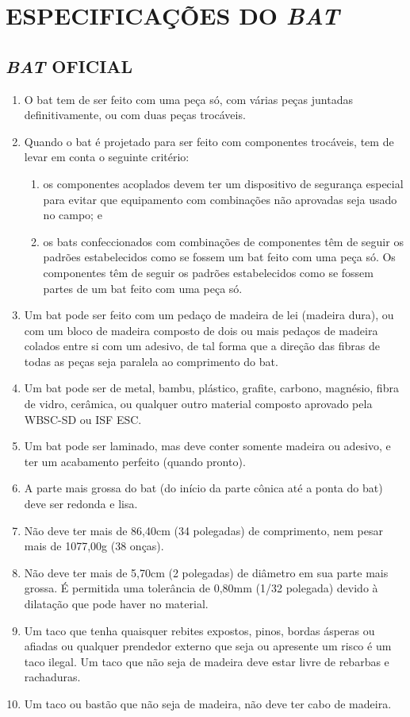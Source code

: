 \chapter{ESPECIFICAÇÕES DO \textit{BAT}}
\minitoc%

\section{\textit{BAT} OFICIAL}

\begin{enumerate}[label=(\arabic*)]
	\item  O \gls{bat} tem de ser feito com uma peça só, com várias peças juntadas definitivamente, ou com duas peças trocáveis.
	\item  Quando o \gls{bat} é projetado para ser feito com componentes trocáveis, tem de levar em conta o seguinte critério:

		\begin{enumerate}[label=\roman*.]
			\item os componentes acoplados devem ter um dispositivo de segurança especial para evitar que equipamento com combinações não aprovadas seja usado no campo; e
			\item os \glspl{bat} confeccionados com combinações de componentes têm de seguir os padrões estabelecidos como se fossem um \gls{bat} feito com uma peça só. Os  componentes têm de seguir os padrões estabelecidos como se fossem partes de um \gls{bat} feito com uma peça só.
		\end{enumerate}

	\item  Um \gls{bat} pode ser feito com um pedaço de madeira de lei (madeira dura), ou com um bloco de madeira composto de dois ou mais pedaços de madeira colados entre si com um adesivo, de tal forma que a direção das fibras de todas as peças seja paralela ao comprimento do \gls{bat}.
	\item  Um \gls{bat} pode ser de metal, bambu, plástico, grafite, carbono, magnésio, fibra de vidro, cerâmica, ou qualquer outro material composto aprovado pela WBSC-SD ou ISF \gls{ESC}.
	\item  Um \gls{bat} pode ser laminado, mas deve conter somente madeira ou adesivo, e ter um acabamento perfeito (quando pronto).
	\item  A parte mais grossa do \gls{bat} (do início da parte cônica até a ponta do \gls{bat}) deve ser redonda e lisa.
	\item  Não deve ter mais de 86,40cm (34 polegadas) de comprimento, nem pesar mais de 1077,00g (38 onças).
	\item  Não deve ter mais de 5,70cm (2 \textonequarter{} polegadas) de diâmetro em sua parte mais grossa. É permitida uma tolerância de 0,80mm (1/32 polegada) devido à dilatação que pode haver no material.
	\item  Um taco que tenha quaisquer rebites expostos, pinos, bordas ásperas ou afiadas ou qualquer prendedor externo que seja ou apresente um risco é um taco ilegal. Um taco que não seja de madeira deve estar livre de rebarbas e rachaduras.
	\item  Um taco ou bastão que não seja de madeira, não deve ter cabo de madeira.


\end{enumerate}
